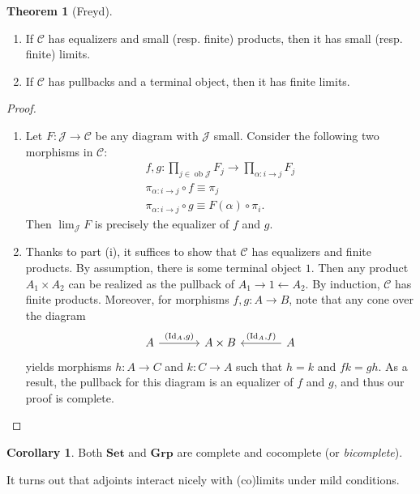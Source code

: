 \documentclass[10pt,letterpaper,cm]{nupset}
\theoremstyle{definition}
\theoremstyle{theorem}
\newtheorem{theorem}[definition]{Theorem}
\newtheorem{corollary}[definition]{Corollary}
\theoremstyle{remark}
\newcommand{\1}{\mathbf{1}}
\renewcommand{\c}{\mathscr{C}}
\renewcommand{\j}{\mathscr{J}}
\newcommand{\0}{\vec 0}
\DeclareMathOperator{\id}{Id}
\DeclareMathOperator{\ob}{ob}
\begin{document}
\begin{theorem}[Freyd] $ $
\begin{enumerate}[label=(\roman*)]
\item If $\c$ has equalizers and small (resp. finite) products, then it has small (resp. finite) limits.
\item If $\c$ has pullbacks and a terminal object, then it has finite limits.
\end{enumerate}
\end{theorem}
\begin{proof} $ $
\begin{enumerate}
\item Let $F : \j \to \c$ be any diagram with $\j$ small. Consider the following two morphisms in $\c$:
\begin{gather*}
f, g: \prod_{j\in \ob{\j}}F_j \to \prod_{\alpha : i \to j}F_j
\\ \pi_{\alpha : i \to j} \circ f \equiv \pi_j
\\ \pi_{\alpha : i \to j} \circ g \equiv F(\alpha) \circ \pi_i.
\end{gather*}
Then $\lim_{\j}{F}$ is precisely the equalizer of $f$ and $g$.
\item Thanks to part (i), it suffices to show that $\c$ has equalizers and finite products. By assumption, there is some terminal object $1$. Then any product $A_1 \times A_2$ can be realized as the pullback of $A_1 \rightarrow 1 \leftarrow A_2$. By induction, $\c$ has finite products. Moreover, for morphisms $f,g : A \to B$, note that any cone over the diagram 
\[
\begin{tikzcd}[column sep=large]
A \arrow[r, "{\left(\id_A, g\right)}"] & A\times B & A \arrow[l, "{\left(\id_A, f\right)}"']
\end{tikzcd}
\] yields morphisms $h: A \to C$ and $k : C \to A$ such that $h=k$ and $fk = gh$. As a result, the pullback for this diagram is an equalizer of $f$ and $g$, and thus our proof is complete.
\end{enumerate}
\end{proof}

\begin{corollary}
Both $\mathbf{Set}$ and $\mathbf{Grp}$ are complete and cocomplete (or \textit{bicomplete}).
\end{corollary}

\medskip

It turns out that adjoints interact nicely with (co)limits under mild conditions.
\end{document}
